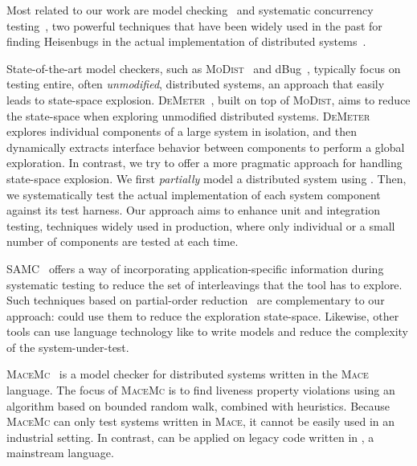 Most related to our work are model checking~\cite{godefroid1997verisoft} and systematic concurrency testing~\cite{musuvathi2008finding, emmi2011delay, thomson2014sct}, two powerful techniques that have been widely used in the past for finding Heisenbugs in the actual implementation of distributed systems~\cite{killian2007life, yang2009modist, yabandeh2009crystalball, guerraoui2011model, guo2011practical, simsa2011dbug, gunawi2011fate, leesatapornwongsa2014samc}.

State-of-the-art model checkers, such as \textsc{MoDist}~\cite{yang2009modist} and dBug~\cite{simsa2011dbug}, typically focus on testing entire, often \emph{unmodified}, distributed systems, an approach that easily leads to state-space explosion. \textsc{DeMeter}~\cite{guo2011practical}, built on top of \textsc{MoDist}, aims to reduce the state-space when exploring unmodified distributed systems. \textsc{DeMeter} explores individual components of a large system in isolation, and then dynamically extracts interface behavior between components to perform a global exploration. In contrast, we try to offer a more pragmatic approach for handling state-space explosion. We first \emph{partially} model a distributed system using \psharp. Then, we systematically test the actual implementation of each system component against its \psharp test harness. Our approach aims to enhance unit and integration testing, techniques widely used in production, where only individual or a small number of components are tested at each time.

SAMC~\cite{leesatapornwongsa2014samc} offers a way of incorporating application-specific information during systematic testing to reduce the set of interleavings that the tool has to explore. Such techniques based on partial-order reduction~\cite{godefroid1996partial, flanagan2005dynamic} are complementary to our approach: \psharp could use them to reduce the exploration state-space. Likewise, other tools can use language technology like \psharp to write models and reduce the complexity of the system-under-test.

\textsc{MaceMc}~\cite{killian2007life} is a model checker for distributed systems written in the \textsc{Mace}~\cite{killian2007mace} language. The focus of \textsc{MaceMc} is to find liveness property violations using an algorithm based on bounded random walk, combined with heuristics. Because \textsc{MaceMc} can only test systems written in \textsc{Mace}, it cannot be easily used in an industrial setting. In contrast, \psharp can be applied on legacy code written in \csharp, a mainstream language.


